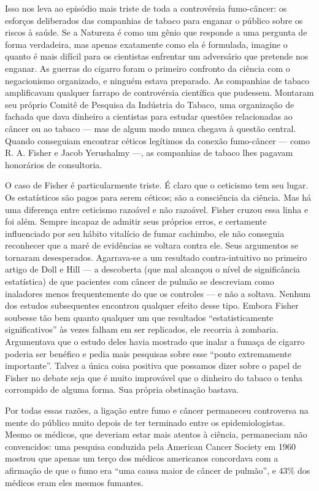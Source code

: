 \documentclass[11pt,a5paper,twoside]{book}
\begin{document}
Isso nos leva ao episódio mais triste de toda a controvérsia fumo-câncer: os esforços deliberados das companhias de tabaco para enganar o público sobre os riscos à saúde. Se a Natureza é como um gênio que responde a uma pergunta de forma verdadeira, mas apenas exatamente como ela é formulada, imagine o quanto é mais difícil para os cientistas enfrentar um adversário que pretende nos enganar. As guerras do cigarro foram o primeiro confronto da ciência com o negacionismo organizado, e ninguém estava preparado. As companhias de tabaco amplificavam qualquer farrapo de controvérsia científica que pudessem. Montaram seu próprio Comitê de Pesquisa da Indústria do Tabaco, uma organização de fachada que dava dinheiro a cientistas para estudar questões relacionadas ao câncer ou ao tabaco — mas de algum modo nunca chegava à questão central. Quando conseguiam encontrar céticos legítimos da conexão fumo-câncer — como R. A. Fisher e Jacob Yerushalmy —, as companhias de tabaco lhes pagavam honorários de consultoria.

O caso de Fisher é particularmente triste. É claro que o ceticismo tem seu lugar. Os estatísticos são pagos para serem céticos; são a consciência da ciência. Mas há uma diferença entre ceticismo razoável e não razoável. Fisher cruzou essa linha e foi além. Sempre incapaz de admitir seus próprios erros, e certamente influenciado por seu hábito vitalício de fumar cachimbo, ele não conseguia reconhecer que a maré de evidências se voltara contra ele. Seus argumentos se tornaram desesperados. Agarrava-se a um resultado contra-intuitivo no primeiro artigo de Doll e Hill — a descoberta (que mal alcançou o nível de significância estatística) de que pacientes com câncer de pulmão se descreviam como inaladores menos frequentemente do que os controles — e não a soltava. Nenhum dos estudos subsequentes encontrou qualquer efeito desse tipo. Embora Fisher soubesse tão bem quanto qualquer um que resultados “estatisticamente significativos” às vezes falham em ser replicados, ele recorria à zombaria. Argumentava que o estudo deles havia mostrado que inalar a fumaça de cigarro poderia ser benéfico e pedia mais pesquisas sobre esse “ponto extremamente importante”. Talvez a única coisa positiva que possamos dizer sobre o papel de Fisher no debate seja que é muito improvável que o dinheiro do tabaco o tenha corrompido de alguma forma. Sua própria obstinação bastava.

Por todas essas razões, a ligação entre fumo e câncer permaneceu controversa na mente do público muito depois de ter terminado entre os epidemiologistas. Mesmo os médicos, que deveriam estar mais atentos à ciência, permaneciam não convencidos: uma pesquisa conduzida pela American Cancer Society em 1960 mostrou que apenas um terço dos médicos americanos concordava com a afirmação de que o fumo era “uma causa maior de câncer de pulmão”, e 43\% dos médicos eram eles mesmos fumantes.
\end{document}
